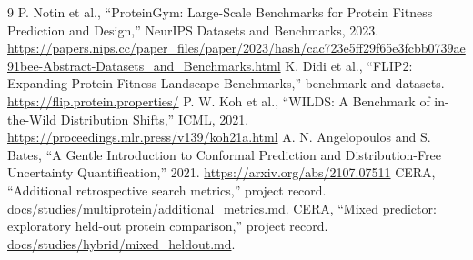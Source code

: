 \documentclass[11pt,a4paper]{article}
\begin{document}
\begin{thebibliography}{9}
 P. Notin et al., ``ProteinGym: Large-Scale Benchmarks for Protein Fitness Prediction and Design,'' NeurIPS Datasets and Benchmarks, 2023. \url{https://papers.nips.cc/paper_files/paper/2023/hash/cac723e5ff29f65e3fcbb0739ae91bee-Abstract-Datasets_and_Benchmarks.html}
 K. Didi et al., ``FLIP2: Expanding Protein Fitness Landscape Benchmarks,'' benchmark and datasets. \url{https://flip.protein.properties/}
 P. W. Koh et al., ``WILDS: A Benchmark of in-the-Wild Distribution Shifts,'' ICML, 2021. \url{https://proceedings.mlr.press/v139/koh21a.html}
 A. N. Angelopoulos and S. Bates, ``A Gentle Introduction to Conformal Prediction and Distribution-Free Uncertainty Quantification,'' 2021. \url{https://arxiv.org/abs/2107.07511}
 CERA, ``Additional retrospective search metrics,'' project record. \href{../docs/studies/multiprotein/additional_metrics.md}{docs/studies/multiprotein/additional\_metrics.md}.
 CERA, ``Mixed predictor: exploratory held-out protein comparison,'' project record. \href{../docs/studies/hybrid/mixed_heldout.md}{docs/studies/hybrid/mixed\_heldout.md}.
\end{thebibliography}
\end{document}
